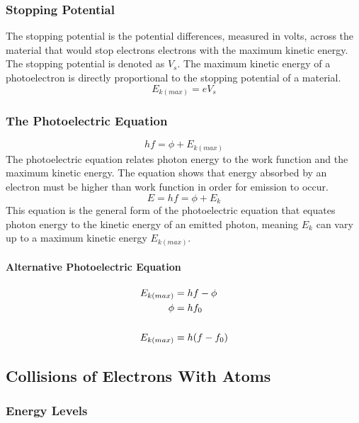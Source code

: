 \documentclass[a4paper,10pt]{article}
\begin{document}
\begin{multicols*}{2}
	\subsubsection{Stopping Potential}
	The stopping potential is the potential differences, measured in volts, across the material that would stop electrons electrons with the maximum kinetic energy. The stopping potential is denoted as $V_s$. The maximum kinetic energy of a photoelectron is directly proportional to the stopping potential of a material.
	\begin{equation}
		E_{k (max)} = eV_s
	\end{equation}
	\subsubsection{The Photoelectric Equation}
	\begin{equation}
		hf = \phi + E_{k (max)}
	\end{equation}
	The photoelectric equation relates photon energy to the work function and the maximum kinetic energy. The equation shows that energy absorbed by an electron must be higher than work function in order for emission to occur.
	\begin{equation}
		E = hf = \phi + E_k
	\end{equation}
	This equation is the general form of the photoelectric equation that equates photon energy to the kinetic energy of an emitted photon, meaning $E_k$ can vary up to a maximum kinetic energy $E_{k (max)}$.
	\paragraph{Alternative Photoelectric Equation}
	\begin{align}
		E_{k (max)} & = hf - \phi  \\
		\phi        & = hf_0       \\ \notag
		\\
		E_{k (max)} & = h(f - f_0)
	\end{align}

	\subsection{Collisions of Electrons With Atoms}
	\subsubsection{Energy Levels}
\end{multicols*}
\end{document}
